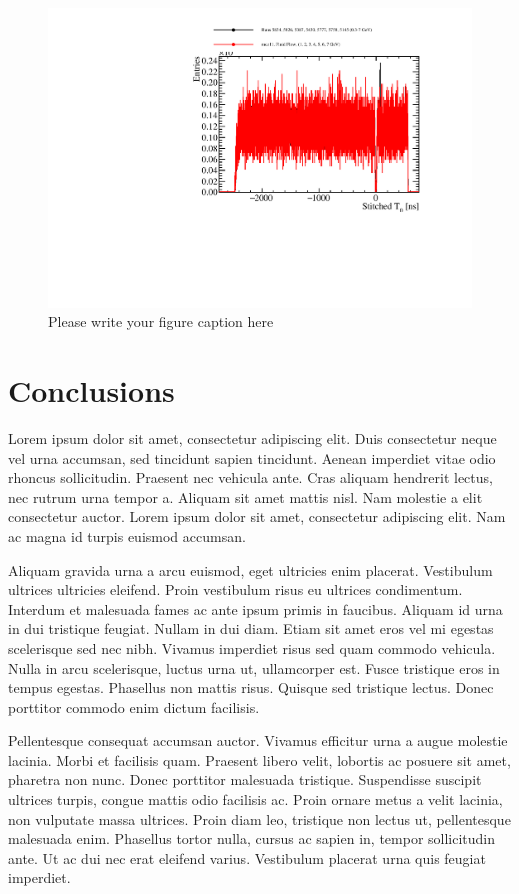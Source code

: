 \begin{figure}
\includegraphics[width=1.0\textwidth]{Figures/Metrics/Data/Cosmics/StitchedT0.pdf}
\caption{Please write your figure caption here}
\label{fig:10}
\end{figure}

\section{Conclusions}

Lorem ipsum dolor sit amet, consectetur adipiscing elit. Duis consectetur neque vel urna accumsan, sed tincidunt sapien tincidunt. Aenean imperdiet vitae odio rhoncus sollicitudin. Praesent nec vehicula ante. Cras aliquam hendrerit lectus, nec rutrum urna tempor a. Aliquam sit amet mattis nisl. Nam molestie a elit consectetur auctor. Lorem ipsum dolor sit amet, consectetur adipiscing elit. Nam ac magna id turpis euismod accumsan.

Aliquam gravida urna a arcu euismod, eget ultricies enim placerat. Vestibulum ultrices ultricies eleifend. Proin vestibulum risus eu ultrices condimentum. Interdum et malesuada fames ac ante ipsum primis in faucibus. Aliquam id urna in dui tristique feugiat. Nullam in dui diam. Etiam sit amet eros vel mi egestas scelerisque sed nec nibh. Vivamus imperdiet risus sed quam commodo vehicula. Nulla in arcu scelerisque, luctus urna ut, ullamcorper est. Fusce tristique eros in tempus egestas. Phasellus non mattis risus. Quisque sed tristique lectus. Donec porttitor commodo enim dictum facilisis.

Pellentesque consequat accumsan auctor. Vivamus efficitur urna a augue molestie lacinia. Morbi et facilisis quam. Praesent libero velit, lobortis ac posuere sit amet, pharetra non nunc. Donec porttitor malesuada tristique. Suspendisse suscipit ultrices turpis, congue mattis odio facilisis ac. Proin ornare metus a velit lacinia, non vulputate massa ultrices. Proin diam leo, tristique non lectus ut, pellentesque malesuada enim. Phasellus tortor nulla, cursus ac sapien in, tempor sollicitudin ante. Ut ac dui nec erat eleifend varius. Vestibulum placerat urna quis feugiat imperdiet.

